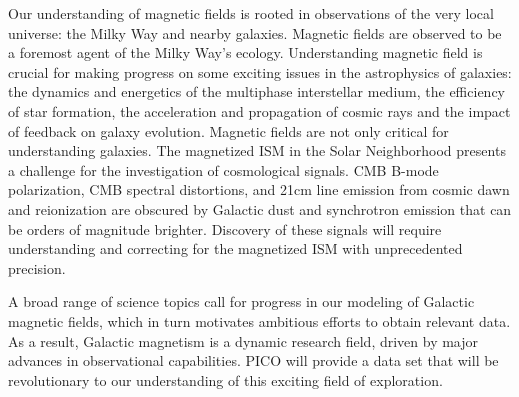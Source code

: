 \documentclass[PICOReport.tex]{subfiles}
\begin{document}
Our understanding of magnetic fields is rooted in 
observations of the very local universe: the Milky Way and nearby galaxies. Magnetic fields are observed to be a foremost agent of the 
Milky Way's ecology. Understanding magnetic field is crucial for making progress on some exciting issues in the astrophysics of galaxies: the dynamics and 
energetics of the multiphase interstellar medium, the efficiency of star formation, the acceleration and propagation of cosmic rays and the 
impact of feedback on galaxy evolution. Magnetic fields are not only critical for understanding galaxies. 
The magnetized ISM in the Solar Neighborhood presents a challenge for the investigation of cosmological signals. 
CMB B-mode polarization, CMB spectral distortions, and 21cm line emission from cosmic dawn and reionization are obscured by Galactic dust and synchrotron emission that can be orders of magnitude brighter. Discovery of these signals will require understanding and correcting for the magnetized ISM with unprecedented precision.

A broad range of science topics call for progress in our modeling of Galactic magnetic fields, which in turn 
motivates ambitious efforts to obtain relevant data. 
As a result, Galactic magnetism is a dynamic research field, driven by major advances in observational capabilities.
PICO will provide a data set that will be revolutionary to our understanding of this exciting field of exploration.
\end{document}
